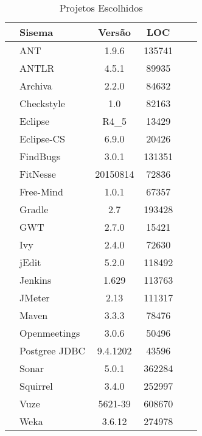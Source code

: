 \begin{table}[ht!] \footnotesize
\centering
	\caption{Projetos Escolhidos}
	\begin{tabular}{l|lcclc}\hline
		 & \textbf{Sisema} & \textbf{Versão} &  \textbf{LOC} \\\hline\hline
		\multirow{22}{*}{\rotatebox[origin=c]{90}{\textbf{Application}}} 
																 & ANT & 1.9.6 & 135741\\
																 & ANTLR  & 4.5.1 & 89935 \\
																 & Archiva  & 2.2.0 & 84632\\
																 & Checkstyle & 1.0 & 82163\\
																 & Eclipse & R4\_5 & 13429\\
																 & Eclipse-CS & 6.9.0 & 20426\\
																 & FindBugs & 3.0.1 & 131351\\
																 & FitNesse & 20150814 & 72836\\
																 & Free-Mind & 1.0.1 & 67357\\
																 & Gradle & 2.7& 193428\\
																 & GWT & 2.7.0 & 15421\\
																 & Ivy & 2.4.0 & 72630\\
																 & jEdit & 5.2.0 & 118492\\
						   									     & Jenkins & 1.629 & 113763\\
																 & JMeter & 2.13 & 111317\\
																 & Maven & 3.3.3 & 78476\\
																 & Openmeetings & 3.0.6 & 50496\\
																 & Postgree JDBC & 9.4.1202 & 43596\\ 
																 & Sonar & 5.0.1 & 362284\\
																 & Squirrel & 3.4.0 & 252997\\
																 & Vuze & 5621-39 & 608670\\
																 & Weka & 3.6.12 & 274978\\
																 \hline
					

\end{tabular}
\end{table}
